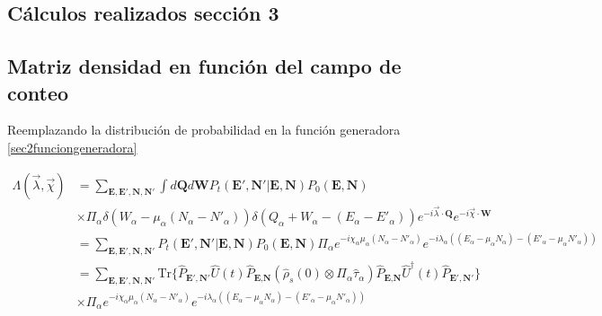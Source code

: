\begin{appendixs}
	
	\section{Cálculos realizados sección 3}

	\subsection{Matriz densidad en función del campo de conteo}
    \label{apendix:fcs1}
    Reemplazando la distribución de probabilidad en la función generadora \ref{sec2funciongeneradora}

    \begin{align*}
        \Lambda(\vec{\lambda},\vec{\chi}) & = \sum_{\textbf{E},\textbf{E}',\textbf{N},\textbf{N}'} \int d\textbf{Q}d\textbf{W} P_{t}(\textbf{E}',\textbf{N}'|\textbf{E},\textbf{N}) P_{0}(\textbf{E},\textbf{N})  \\
        & \times \Pi_{\alpha} \delta(W_{\alpha} - \mu_{\alpha}(N_{\alpha} - N'_{\alpha}) ) \delta(Q_{\alpha} + W_{\alpha} -(E_{\alpha} - E'_{\alpha})) e^{-i\vec{\lambda}\cdot \textbf{Q}} e^{-i\vec{\chi}\cdot \textbf{W}} \\
        & = \sum_{\textbf{E},\textbf{E}',\textbf{N},\textbf{N}'}P_{t}(\textbf{E}',\textbf{N}'|\textbf{E},\textbf{N})P_{0}(\textbf{E},\textbf{N}) \Pi_{\alpha}e^{-i\chi_{\alpha}\mu_{\alpha}(N_{\alpha} - N'_{\alpha})}e^{-i\lambda_{\alpha}((E_{\alpha} -\mu_{\alpha}N_{\alpha}) - (E'_{\alpha} - \mu_{\alpha}N'_{\alpha}) ) }  \\
        & = \sum_{\textbf{E},\textbf{E}',\textbf{N},\textbf{N}'} \text{Tr}\{\hat{P}_{\textbf{E}',\textbf{N}'}\hat{U}(t)\hat{P}_{\textbf{E},\textbf{N}}(\hat{\rho}_{s}(0) \otimes \Pi_{\alpha}\hat{\tau}_{\alpha} )\hat{P}_{\textbf{E},\textbf{N}}\hat{U}^{\dagger}(t)\hat{P}_{\textbf{E}',\textbf{N}'}   \} \\
        & \times \Pi_{\alpha} e^{-i\chi_{\alpha}\mu_{\alpha}(N_{\alpha} - N'_{\alpha})}e^{-i\lambda_{\alpha}((E_{\alpha} -\mu_{\alpha}N_{\alpha}) - (E'_{\alpha} - \mu_{\alpha}N'_{\alpha}) ) }
    \end{align*}


\end{appendixs}
